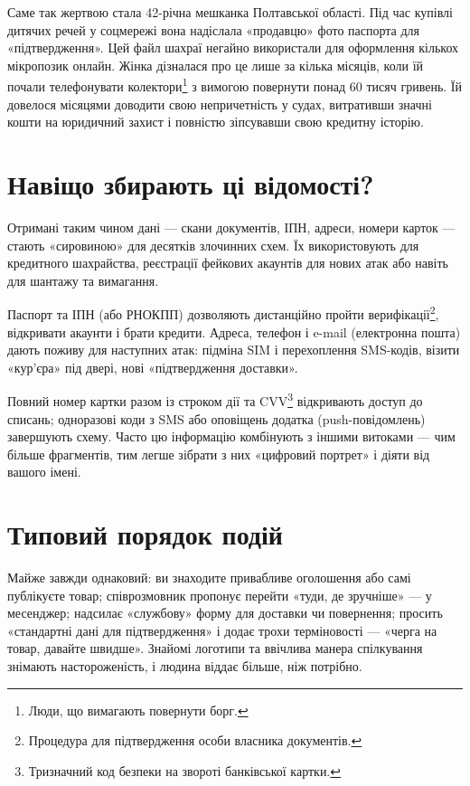 Саме так жертвою стала 42-річна мешканка Полтавської області. Під час купівлі дитячих речей у соцмережі вона надіслала «продавцю» фото паспорта для «підтвердження». Цей файл шахраї негайно використали для оформлення кількох мікропозик онлайн. Жінка дізналася про це лише за кілька місяців, коли їй почали телефонувати колектори\footnote{Люди, що вимагають повернути борг.} з вимогою повернути понад 60 тисяч гривень. Їй довелося місяцями доводити свою непричетність у судах, витративши значні кошти на юридичний захист і повністю зіпсувавши свою кредитну історію.

\newpage

\section{Навіщо збирають ці відомості?}

Отримані таким чином дані — скани документів, ІПН, адреси, номери карток — стають «сировиною» для десятків злочинних схем. Їх використовують для кредитного шахрайства, реєстрації фейкових акаунтів для нових атак або навіть для шантажу та вимагання.

Паспорт та ІПН (або РНОКПП) дозволяють дистанційно пройти верифікації\footnote{Процедура для підтвердження особи власника документів.}, відкривати акаунти і брати кредити. Адреса, телефон і e-mail (електронна пошта) дають поживу для наступних атак: підміна SIM і перехоплення SMS-кодів, візити «кур'єра» під двері, нові «підтвердження доставки». 

Повний номер картки разом із строком дії та CVV\footnote{Тризначний код безпеки на звороті банківської картки.} відкривають доступ до списань; одноразові коди з SMS або оповіщень додатка (push-повідомлень) завершують схему. Часто цю інформацію комбінують з іншими витоками — чим більше фрагментів, тим легше зібрати з них «цифровий портрет» і діяти від вашого імені.

\vspace{0.3cm}
\section{Типовий порядок подій}

Майже завжди однаковий: ви знаходите привабливе оголошення або самі публікуєте товар; співрозмовник пропонує перейти «туди, де зручніше» — у месенджер; надсилає «службову» форму для доставки чи повернення; просить «стандартні дані для підтвердження» і додає трохи терміновості — «черга на товар, давайте швидше». Знайомі логотипи та ввічлива манера спілкування знімають настороженість, і людина віддає більше, ніж потрібно.

